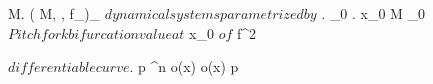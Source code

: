 \documentclass[../Main/main]{subfiles}
\begin{document}
{	
	{
		{
			\Lambda \subset M.
			( M, \N, f_\lambda )_{\lambda \in \Lambda} $ dynamical systems parametrized by $ \Lambda.
			\lambda_0 \in \Lambda.
			x_0 \in M
		}
		{
			\lambda_0 $ Pitchfork bifurcation value at $ x_0 $ of $ f^2
		}
	}


	{
		{
			\gamma $ differentiable curve $.
			p \in \R^n
		}
		{
			{
				o(x) \subset \gamma*
			}
		}
		{
			{
				o(x) \convergesto p
			}
		}
	}

}
\end{document}
